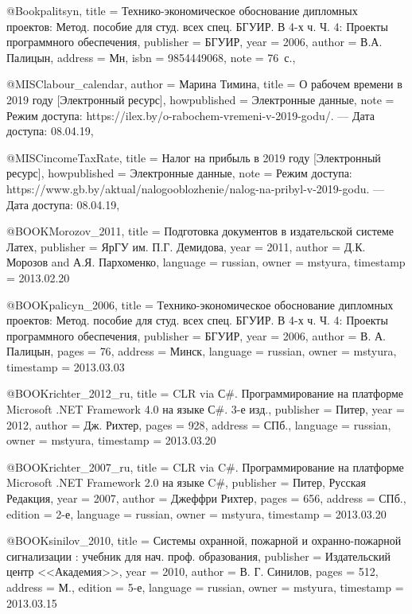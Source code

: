 @Book{palitsyn,
  title     = {Технико-экономическое обоснование дипломных проектов: Метод. пособие для студ. всех спец. БГУИР. В 4-х ч. Ч. 4: Проекты программного обеспечения},
  publisher = {БГУИР},
  year      = {2006},
  author    = {В.А. Палицын},
  address   = {Мн},
  isbn      = {9854449068},
  note      = {76~с.},
}

@MISC{labour_calendar,
  author       = {Марина Тимина},
  title        = {О рабочем времени в 2019 году [Электронный ресурс]},
  howpublished = {Электронные данные},
  note         = {Режим доступа: https://ilex.by/o-rabochem-vremeni-v-2019-godu/. --- Дата доступа: 08.04.19},
}

@MISC{incomeTaxRate,
  title        = {Налог на прибыль в 2019 году [Электронный ресурс]},
  howpublished = {Электронные данные},
  note         = {Режим доступа: https://www.gb.by/aktual/nalogooblozhenie/nalog-na-pribyl-v-2019-godu. --- Дата доступа: 08.04.19},
}


@BOOK{Morozov_2011,
  title = {Подготовка документов в издательской системе Латех},
  publisher = {ЯрГУ им. П.Г. Демидова},
  year = {2011},
  author = {Д.К. Морозов and А.Я. Пархоменко},
  language = {russian},
  owner = {mstyura},
  timestamp = {2013.02.20}
}

@BOOK{palicyn_2006,
  title = {Технико-экономическое обоснование дипломных проектов: Метод. пособие
	для студ. всех спец. БГУИР. В 4-х ч. Ч. 4: Проекты программного обеспечения},
  publisher = {БГУИР},
  year = {2006},
  author = {В. А. Палицын},
  pages = {76},
  address = {Минск},
  language = {russian},
  owner = {mstyura},
  timestamp = {2013.03.03}
}

@BOOK{richter_2012_ru,
  title = {CLR via С\#. Программирование на платформе Microsoft .NET Framework
	4.0 на языке С\#. 3-е изд.},
  publisher = {Питер},
  year = {2012},
  author = {Дж. Рихтер},
  pages = {928},
  address = {СПб.},
  language = {russian},
  owner = {mstyura},
  timestamp = {2013.03.20}
}

@BOOK{richter_2007_ru,
  title = {CLR via C\#. Программирование на платформе Microsoft .NET Framework
	2.0 на языке C\#},
  publisher = {Питер, Русская Редакция},
  year = {2007},
  author = {Джеффри Рихтер},
  pages = {656},
  address = {СПб.},
  edition = {2-е},
  language = {russian},
  owner = {mstyura},
  timestamp = {2013.03.20}
}

@BOOK{sinilov_2010,
  title = {Системы охранной, пожарной и охранно-пожарной сигнализации : учебник
	для нач. проф. образования},
  publisher = {Издательский центр <<Академия>>},
  year = {2010},
  author = {В. Г. Синилов},
  pages = {512},
  address = {М.},
  edition = {5-е},
  language = {russian},
  owner = {mstyura},
  timestamp = {2013.03.15}
}

